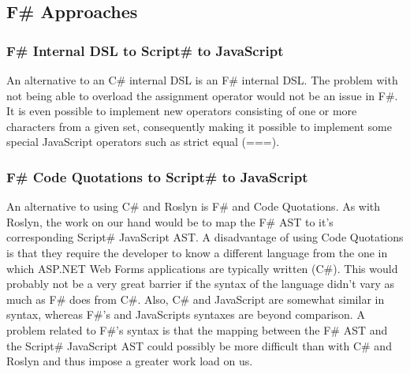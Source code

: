 
	\subsection{F\# Approaches} %
	\label{sub:f_approaches}
	
		\subsubsection{F\# Internal DSL to Script\# to JavaScript} %
		\label{ssub:f_internal_dsl_to_script_to_javascript}
			An alternative to an C\# internal DSL is an F\# internal DSL. The problem with not being able to overload the assignment operator would not be an issue in F\#. It is even possible to implement new operators consisting of one or more characters from a given set, consequently making it possible to implement some special JavaScript operators such as strict equal (===).

		\subsubsection{F\# Code Quotations to Script\# to JavaScript} %
		\label{ssub:f_code_quotations_to_script_to_javascript}
			An alternative to using C\# and Roslyn is F\# and Code Quotations. As with Roslyn, the work on our hand would be to map the F\# AST to it's corresponding Script\# JavaScript AST. A disadvantage of using Code Quotations is that they require the developer to know a different language from the one in which ASP.NET Web Forms applications are typically written (C\#). This would probably not be a very great barrier if the syntax of the language didn't vary as much as F\# does from C\#. Also, C\# and JavaScript are somewhat similar in syntax, whereas F\#'s and JavaScripts syntaxes are beyond comparison. A problem related to F\#'s syntax is that the mapping between the F\# AST and the Script\# JavaScript AST could possibly be more difficult than with C\# and Roslyn and thus impose a greater work load on us.





